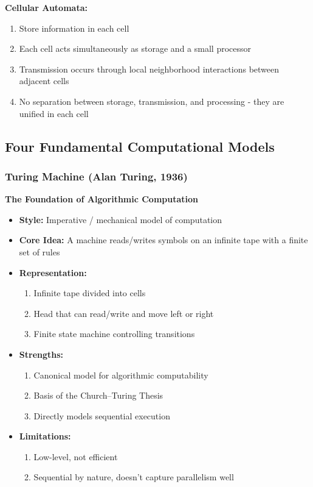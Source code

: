 \textbf{Cellular Automata:}

\begin{enumerate}
\item Store information in each cell
\item Each cell acts simultaneously as storage and a small processor
\item Transmission occurs through local neighborhood interactions between adjacent cells
\item No separation between storage, transmission, and processing - they are unified in each cell
\end{enumerate}

\subsection{Four Fundamental Computational Models}
\label{subsec:four-computational-models}

\subsubsection{Turing Machine (Alan Turing, 1936)}
\label{subsubsec:turing-machine}

\textbf{The Foundation of Algorithmic Computation}

\begin{itemize}
\item \textbf{Style:} Imperative / mechanical model of computation
\item \textbf{Core Idea:} A machine reads/writes symbols on an infinite tape with a finite set of rules
\item \textbf{Representation:}
\begin{enumerate}
\item Infinite tape divided into cells
\item Head that can read/write and move left or right
\item Finite state machine controlling transitions
\end{enumerate}
\item \textbf{Strengths:}
\begin{enumerate}
\item Canonical model for algorithmic computability
\item Basis of the Church–Turing Thesis
\item Directly models sequential execution
\end{enumerate}
\item \textbf{Limitations:}
\begin{enumerate}
\item Low-level, not efficient
\item Sequential by nature, doesn't capture parallelism well
\end{enumerate}
\end{itemize}

